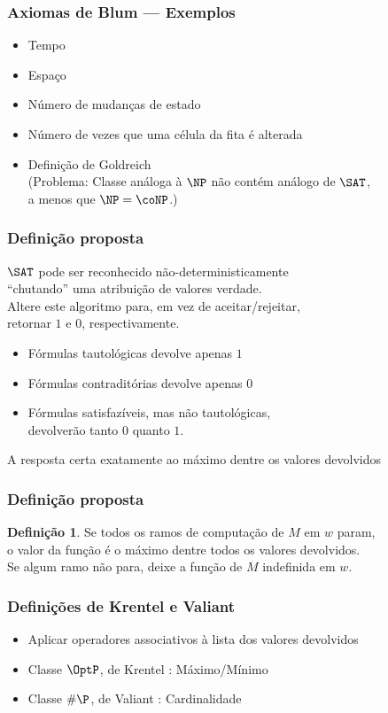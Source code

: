 \documentclass[utf8,notheorems]{beamer}
\theoremstyle{definition}
\newtheorem*{definition}{Definição}
\begin{document}
\begin{frame}
    \frametitle{Axiomas de Blum --- Exemplos}
    \begin{itemize}
        \item Tempo
        \item Espaço
        \item Número de mudanças de estado
        \item Número de vezes que uma célula da fita é alterada
        \item Definição de Goldreich \\
            (Problema: Classe análoga à $\NP$ não contém análogo de $\SAT$, \\
            a menos que $\NP = \coNP$.)
    \end{itemize}
\end{frame}

\begin{frame}
    \frametitle{Definição proposta}
    $\SAT$ pode ser reconhecido não-deterministicamente \\
    ``chutando'' uma atribuição de valores verdade. \\
    Altere este algoritmo para, em vez de aceitar/rejeitar, \\
    retornar $1$ e $0$, respectivamente.
    \begin{itemize}
        \item Fórmulas tautológicas devolve apenas $1$
        \item Fórmulas contraditórias devolve apenas $0$
        \item Fórmulas satisfazíveis, mas não tautológicas, \\
            devolverão tanto $0$ quanto $1$.
    \end{itemize}
    A resposta certa exatamente ao máximo dentre os valores devolvidos
\end{frame}

\begin{frame}
    \frametitle{Definição proposta}
    \begin{definition}
        Se todos os ramos de computação de $M$ em $w$ param, \\
        o valor da função é o máximo dentre todos os valores devolvidos. \\
        Se algum ramo não para, deixe a função de $M$ indefinida em $w$.
    \end{definition}
\end{frame}

\begin{frame}
    \frametitle{Definições de Krentel e Valiant}
    \begin{itemize}
        \item Aplicar operadores associativos à lista dos valores devolvidos
        \item Classe $\OptP$, de Krentel \cite{Krentel1988}: Máximo/Mínimo
        \item Classe $\#\P$, de Valiant \cite{Valiant1979}: Cardinalidade
    \end{itemize}
\end{frame}
\end{document}
